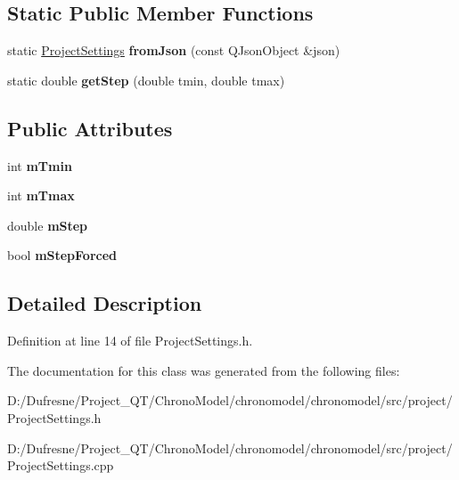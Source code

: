 \subsection*{Static Public Member Functions}
\begin{DoxyCompactItemize}
\item 
\hypertarget{class_project_settings_af13628b1ae2b7522c05aaffcea528cf2}{static \hyperlink{class_project_settings}{Project\-Settings} {\bfseries from\-Json} (const Q\-Json\-Object \&json)}\label{class_project_settings_af13628b1ae2b7522c05aaffcea528cf2}

\item 
\hypertarget{class_project_settings_aa19fb7374801ecf2adb17314996144de}{static double {\bfseries get\-Step} (double tmin, double tmax)}\label{class_project_settings_aa19fb7374801ecf2adb17314996144de}

\end{DoxyCompactItemize}
\subsection*{Public Attributes}
\begin{DoxyCompactItemize}
\item 
\hypertarget{class_project_settings_a61369ca4389809d661af3bd2ccf4eaee}{int {\bfseries m\-Tmin}}\label{class_project_settings_a61369ca4389809d661af3bd2ccf4eaee}

\item 
\hypertarget{class_project_settings_a5efc833aa4f6d1d03dbb543c81b1494c}{int {\bfseries m\-Tmax}}\label{class_project_settings_a5efc833aa4f6d1d03dbb543c81b1494c}

\item 
\hypertarget{class_project_settings_a9f7effb436156fec97bd237189da8e54}{double {\bfseries m\-Step}}\label{class_project_settings_a9f7effb436156fec97bd237189da8e54}

\item 
\hypertarget{class_project_settings_abf58c9ad9beb54c27214c594d69e31c4}{bool {\bfseries m\-Step\-Forced}}\label{class_project_settings_abf58c9ad9beb54c27214c594d69e31c4}

\end{DoxyCompactItemize}


\subsection{Detailed Description}


Definition at line 14 of file Project\-Settings.\-h.



The documentation for this class was generated from the following files\-:\begin{DoxyCompactItemize}
\item 
D\-:/\-Dufresne/\-Project\-\_\-\-Q\-T/\-Chrono\-Model/chronomodel/chronomodel/src/project/Project\-Settings.\-h\item 
D\-:/\-Dufresne/\-Project\-\_\-\-Q\-T/\-Chrono\-Model/chronomodel/chronomodel/src/project/Project\-Settings.\-cpp\end{DoxyCompactItemize}
